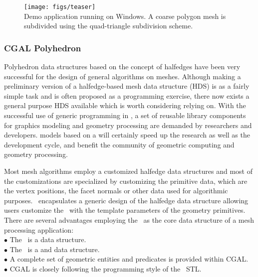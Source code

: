 \documentclass[letter,twocolumn]{article}
\begin{document}
\begin{figure}[htb]
  \centering
  \texttt{[image: figs/teaser]}\\ {\scriptsize Demo
  application running on Windows. A coarse polygon mesh is subdivided
  using the quad-triangle subdivision scheme.}
  \label{fig:viewer}
\end{figure}


\subsubsection*{CGAL Polyhedron}

Polyhedron data structures based on the concept of halfedges have been
very successful for the design of general algorithms on meshes.
Although making a preliminary version of a halfedge-based mesh data
structure (HDS) is as a fairly simple task and is often proposed as a
programming exercise, there now exists a general purpose HDS available
which is worth considering relying on. With the successful use of
generic programming in \CC , a set of reusable library components for
graphics modeling and geometry processing are demanded by researchers
and developers.  models based on a
will certainly speed up the research as well as the development cycle,
and benefit the community of geometric computing and geometry
processing.

Most mesh algorithms employ a customized halfedge data structures and
most of the customizations are specialized by customizing the
primitive data, which are the vertex positions, the facet normals or
other data used for algorithmic purposes. \cgalpoly\ encapsulates a
generic design of the halfedge data structure allowing users customize
the \poly\ with the template parameters of the geometry
primitives. There are several advantages employing the \poly\ as the
core data structure of a mesh processing application: \\

\indent $\bullet$ The \poly\ is a  data structure.\\
\indent $\bullet$ The \poly\ is a  and  
                  data structure.\\
\indent $\bullet$ A complete set of geometric entities and predicates
                  is provided within CGAL.\\
\indent $\bullet$ CGAL is closely following the programming 
                  style of the \CC\ STL.
\end{document}
